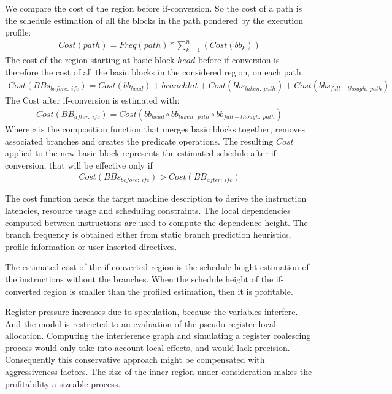 We compare the cost of the region before if-conversion. So the cost of a path is the schedule estimation of all the blocks in the path pondered by the execution profile:
\begin{align*}
Cost(path)=Freq(path)*\sum_{k=1}^n(Cost(bb_{k}))
\end{align*}
The cost of the region starting at basic block $head$ before if-conversion is therefore the cost of all the basic blocks in the considered region, on each path.
\begin{align*}
Cost(BBs_{before:\ ifc})=Cost(bb_{head}) + branchlat + Cost(bbs_{taken:\ path}) + Cost(bbs_{fall-though:\ path})
\end{align*}
The Cost after if-conversion is estimated with:
\begin{align*}
Cost(BB_{after:\ ifc})=Cost(bb_{head} \circ bb_{taken:\ path} \circ bb_{fall-though:\ path})
\end{align*}
Where $\circ$ is the composition function that merges basic blocks together, removes associated branches and creates the predicate operations. The resulting $Cost$ applied to the new basic block represents the estimated schedule after if-conversion, that will be effective only if
\begin{align*}
Cost(BBs_{before:\ ifc}) > Cost(BB_{after:\ ifc})
\end{align*}

The cost function needs the target machine description to derive the instruction latencies, resource usage and scheduling constraints. The local dependencies computed between instructions are used to compute the dependence height. The branch frequency is obtained either from static branch prediction heuristics, profile information or user inserted directives.

The estimated cost of the if-converted region is the schedule height estimation of the instructions without the branches. When the schedule height of the if-converted region is smaller than the profiled estimation, then it is profitable.

Register pressure increases due to speculation, because the variables interfere. And the model is restricted to an evaluation of the pseudo register local allocation. Computing the interference graph and simulating a register coalescing process would only take into account local effects, and would lack precision. Consequently this conservative approach might be compensated with aggressiveness factors. The size of the inner region under consideration makes the profitability a sizeable process.

